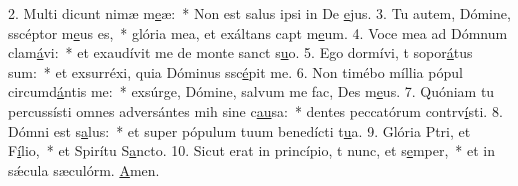 2. Multi dicunt nimæ m\uline{e}æ:~* Non est salus ipsi in De \uline{e}jus.
3. Tu autem, Dómine, sscéptor m\uline{e}us es,~* glória mea, et exáltans capt m\uline{e}um.
4. Voce mea ad Dómnum clam\uline{á}vi:~* et exaudívit me de monte sanct s\uline{u}o.
5. Ego dormívi, t sopor\uline{á}tus sum:~* et exsurréxi, quia Dóminus ssc\uline{é}pit me.
6. Non timébo míllia pópul circumd\uline{á}ntis me:~* exsúrge, Dómine, salvum me fac, Des m\uline{e}us.
7. Quóniam tu percussísti omnes adversántes mih sine c\uline{au}sa:~* dentes peccatórum contrv\uline{í}sti.
8. Dómni est s\uline{a}lus:~* et super pópulum tuum benedícti t\uline{u}a.
9. Glória Ptri, et F\uline{í}lio,~* et Spirítu S\uline{a}ncto.
10. Sicut erat in princípio, t nunc, et s\uline{e}mper,~* et in sǽcula sæculórm. \uline{A}men.

